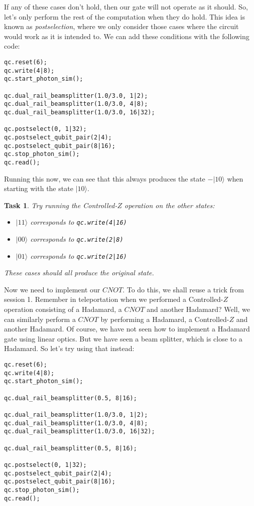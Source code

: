 \documentclass[twocolumn]{article}
\newtheorem{task}{Task}[section]
\begin{document}
If any of these cases don't hold, then our gate will not operate as it should. So, let's only perform the rest of the computation when they do hold. This idea is known as {\em postselection}, where we only consider those cases where the circuit would work as it is intended to. We can add these conditions with the following code:

\begin{lstlisting}
qc.reset(6);
qc.write(4|8);
qc.start_photon_sim();

qc.dual_rail_beamsplitter(1.0/3.0, 1|2);
qc.dual_rail_beamsplitter(1.0/3.0, 4|8);
qc.dual_rail_beamsplitter(1.0/3.0, 16|32);

qc.postselect(0, 1|32);
qc.postselect_qubit_pair(2|4);
qc.postselect_qubit_pair(8|16);
qc.stop_photon_sim();
qc.read();
\end{lstlisting}

Running this now, we can see that this always produces the state $-|10\rangle$ when starting with the state $|10\rangle$.

\begin{task}
\label{task:cz}
Try running the Controlled-$Z$ operation on the other states:
\begin{itemize}
\item $|11\rangle$ corresponds to \texttt{qc.write(4|16)}
\item $|00\rangle$ corresponds to \texttt{qc.write(2|8)}
\item $|01\rangle$ corresponds to \texttt{qc.write(2|16)}
\end{itemize}

These cases should all produce the original state.
\end{task}

Now we need to implement our $CNOT$. To do this, we shall reuse a trick from session 1. Remember in teleportation when we performed a Controlled-$Z$ operation consisting of a Hadamard, a $CNOT$ and another Hadamard? Well, we can similarly perform a $CNOT$ by performing a Hadamard, a Controlled-$Z$ and another Hadamard. Of course, we have not seen how to implement a Hadamard gate using linear optics. But we have seen a beam splitter, which is close to a Hadamard. So let's try using that instead:

\begin{lstlisting}
qc.reset(6);
qc.write(4|8);
qc.start_photon_sim();

qc.dual_rail_beamsplitter(0.5, 8|16);

qc.dual_rail_beamsplitter(1.0/3.0, 1|2);
qc.dual_rail_beamsplitter(1.0/3.0, 4|8);
qc.dual_rail_beamsplitter(1.0/3.0, 16|32);

qc.dual_rail_beamsplitter(0.5, 8|16);

qc.postselect(0, 1|32);
qc.postselect_qubit_pair(2|4);
qc.postselect_qubit_pair(8|16);
qc.stop_photon_sim();
qc.read();
\end{lstlisting}
\end{document}
